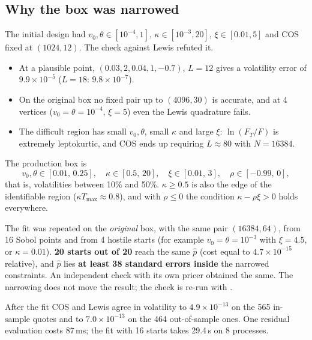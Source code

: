 \subsection{Why the box was narrowed}
The initial design had $v_0,\theta\in[10^{-4},1]$, $\kappa\in[10^{-3},20]$, $\xi\in[0.01,5]$ and COS fixed at
$(1024,12)$. The check against Lewis refuted it.
\begin{itemize}
\item At a plausible point, $(0.03,2,0.04,1,-0.7)$, $L=12$ gives a volatility error of $9.9\times10^{-5}$ ($L=18$:
$9.8\times10^{-7}$).
\item On the original box no fixed pair up to $(4096,30)$ is accurate, and at 4 vertices ($v_0=\theta=10^{-4}$,
$\xi=5$) even the Lewis quadrature fails.
\item The difficult region has small $v_0,\theta$, small $\kappa$ and large $\xi$: $\ln(F_T/F)$ is extremely
leptokurtic, and COS ends up requiring $L\approx80$ with $N=16384$.
\end{itemize}
The production box is
\begin{equation}\label{eq:cal-box}
v_0,\theta\in[0.01,\,0.25],\quad \kappa\in[0.5,\,20],\quad \xi\in[0.01,\,3],\quad \rho\in[-0.99,\,0],
\end{equation}
that is, volatilities between 10\% and 50\%. $\kappa\ge0.5$ is also the edge of the identifiable region
($\kappa T_{\max}\approx0.8$), and with $\rho\le0$ the condition $\kappa-\rho\xi>0$ holds everywhere.

\begin{attenzione}[title={Isn't narrowing the constraints cheating? The check}]
The fit was repeated on the \emph{original} box, with the same pair $(16384,64)$, from 16 Sobol points and from 4
hostile starts (for example $v_0=\theta=10^{-3}$ with $\xi=4.5$, or $\kappa=0.01$). \textbf{20 starts out of 20} reach
the same $\hat p$ (cost equal to $4.7\times10^{-15}$ relative), and $\hat p$ lies \textbf{at least 38 standard errors
inside} the narrowed constraints. An independent check with its own pricer obtained the same. The narrowing does not
move the result; the check is re-run with .
\end{attenzione}

\begin{progetto}[title={In the qpricer project: frozen COS}]
After the fit COS and Lewis agree in volatility to $4.9\times10^{-13}$ on the 565 in-sample quotes and to
$7.0\times10^{-13}$ on the 464 out-of-sample ones. One residual evaluation costs 87\,ms; the fit with 16 starts takes
29.4\,s on 8 processes.
\end{progetto}

